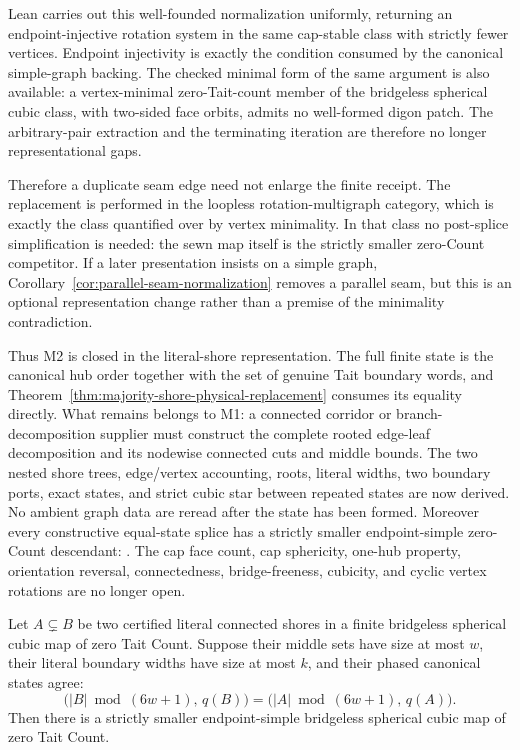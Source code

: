 Lean carries out this well-founded normalization uniformly, returning an
endpoint-injective rotation system in the same cap-stable class with strictly
fewer vertices.  Endpoint injectivity is exactly the condition consumed by
the canonical simple-graph backing.  The checked minimal form of the same
argument is also available:
a vertex-minimal zero-Tait-count member of the bridgeless spherical cubic
class, with two-sided face orbits, admits no well-formed digon patch.  The
arbitrary-pair extraction and the terminating iteration are therefore no
longer representational gaps.

Therefore a duplicate seam edge need not enlarge the finite receipt.  The
replacement is performed in the loopless rotation-multigraph category, which
is exactly the class quantified over by vertex minimality.  In that class no
post-splice simplification is needed: the sewn map itself is the strictly
smaller zero-Count competitor.  If a later presentation insists on a simple
graph, Corollary~\ref{cor:parallel-seam-normalization} removes a parallel seam,
but this is an optional representation change rather than a premise of the
minimality contradiction.

Thus M2 is closed in the literal-shore representation.  The full finite state
is the canonical hub order together with the set of genuine Tait boundary
words, and Theorem~\ref{thm:majority-shore-physical-replacement} consumes its
equality directly.  What remains belongs to M1: a connected corridor or
branch-decomposition supplier must construct the complete rooted edge-leaf
decomposition and its nodewise connected cuts and middle bounds.  The two
nested shore trees, edge/vertex accounting, roots, literal widths, two
boundary ports, exact states, and strict cubic star between repeated states
are now derived.  No ambient graph data are reread after the state has been
formed.
Moreover every constructive equal-state splice has a strictly smaller
endpoint-simple zero-Count descendant:
.
The cap face count, cap sphericity,
one-hub property, orientation reversal, connectedness, bridge-freeness,
cubicity, and cyclic vertex rotations are no longer open.

\begin{corollary}
\label{cor:phased-literal-shore-replacement}
Let \(A\subsetneq B\) be two certified literal connected shores in a finite
bridgeless spherical cubic map of zero Tait Count.  Suppose their middle sets
have size at most \(w\), their literal boundary widths have size at most
\(k\), and their phased canonical states agree:
\[
 \bigl(|B|\bmod(6w+1),\,q(B)\bigr)
   =\bigl(|A|\bmod(6w+1),\,q(A)\bigr).
\]
Then there is a strictly smaller endpoint-simple bridgeless spherical cubic
map of zero Tait Count.
\end{corollary}

